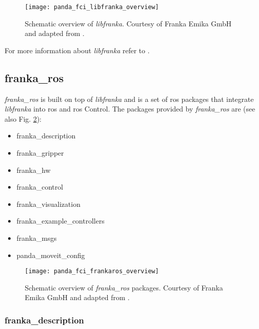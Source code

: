 \begin{figure}[htbp]
    \centering
	\texttt{[image: panda\_fci\_libfranka\_overview]}
	\caption{Schematic overview of \textit{libfranka}. Courtesy of Franka Emika GmbH and adapted from \cite{FrankaEmikaGmbH_fci_documentation}.}
	\label{fig:panda_fci_libfranka_overview}
\end{figure}

For more information about \textit{libfranka} refer to \cite{FrankaEmikaGmbH_fci_documentation}.


\subsection{franka\_ros}
\label{subsec:ros_setup_robotic_system_integration_ros_franka_ros}

\textit{franka\_ros} is built on top of \textit{libfranka} and is a set of \gls{ros} packages that integrate \textit{libfranka} into \gls{ros} and \gls{ros} Control. The packages provided by \textit{franka\_ros} are (see also Fig. \ref{fig:panda_fci_frankaros_overview}):

\begin{itemize}
    \item franka\_description
    \item franka\_gripper
    \item franka\_hw
    \item franka\_control
    \item franka\_visualization
    \item franka\_example\_controllers
    \item franka\_msgs
    \item panda\_moveit\_config
\end{itemize}

\begin{figure}[htbp]
    \centering
	\texttt{[image: panda\_fci\_frankaros\_overview]}
	\caption{Schematic overview of \textit{franka\_ros} packages. Courtesy of Franka Emika GmbH and adapted from \cite{FrankaEmikaGmbH_fci_documentation}.}
	\label{fig:panda_fci_frankaros_overview}
\end{figure}

\subsubsection*{franka\_description}
\label{subsubsec:ros_setup_robotic_system_integration_ros_franka_ros_franka_description}

